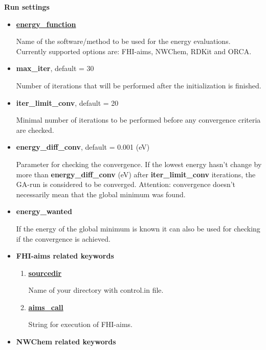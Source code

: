 \documentclass[a4paper]{article}
\begin{document}
\noindent
\textbf{\large{Run settings}}

\begin{itemize}

 \item{\underline{\textbf{energy\_function}}}
 
Name of the software/method to be used for the energy evaluations. Currently supported options are: FHI-aims, NWChem, RDKit and ORCA. 
 
    \item{\textbf{max\_iter}}, default = 30
	
Number of iterations that will be performed after the initialization is finished.     
    
	\item{\textbf{iter\_limit\_conv}}, default = 20 
	
Minimal number of iterations to be performed before any convergence criteria are checked.
	
	\item{\textbf{energy\_diff\_conv}}, default = 0.001 (eV)
	
Parameter for checking the convergence. If the lowest energy hasn't change by more than \textbf{energy\_diff\_conv} (eV) after \textbf{iter\_limit\_conv} iterations, the GA-run is considered to be converged. Attention: convergence doesn't necessarily mean that the global minimum was found.  

	\item{\textbf{energy\_wanted}}

If the energy of the global minimum is known it can also be used for checking if the convergence is achieved. 

	\item{\textbf{\large{FHI-aims related keywords}}}

\begin{enumerate}


	\item{\underline{\textbf{sourcedir}}}

Name of your directory with control.in file. 


	\item{\underline{\textbf{aims\_call}}}
	
String for execution of FHI-aims.


\end{enumerate}
\item{\textbf{\large{NWChem related keywords}}}
\begin{enumerate}


\end{enumerate}
\end{itemize}
\end{document}
